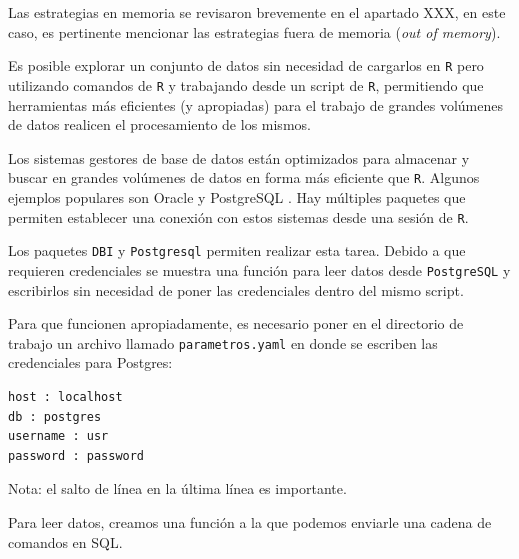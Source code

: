 \documentclass[]{article}
\begin{document}
Las estrategias en memoria se revisaron brevemente en el apartado XXX,
en este caso, es pertinente mencionar las estrategias fuera de memoria
(\emph{out of memory}).

Es posible explorar un conjunto de datos sin necesidad de cargarlos en
\texttt{R} pero utilizando comandos de \texttt{R} y trabajando desde un
script de \texttt{R}, permitiendo que herramientas más eficientes (y
apropiadas) para el trabajo de grandes volúmenes de datos realicen el
procesamiento de los mismos.

Los sistemas gestores de base de datos están optimizados para almacenar
y buscar en grandes volúmenes de datos en forma más eficiente que
\texttt{R}. Algunos ejemplos populares son Oracle y PostgreSQL
\parencite[][sección ``working with large datasets'']{peng2016m}. Hay
múltiples paquetes que permiten establecer una conexión con estos
sistemas desde una sesión de \texttt{R}.

Los paquetes \texttt{DBI} y \texttt{Postgresql} permiten realizar esta
tarea. Debido a que requieren credenciales se muestra una función para
leer datos desde \texttt{PostgreSQL} y escribirlos sin necesidad de
poner las credenciales dentro del mismo script.

Para que funcionen apropiadamente, es necesario poner en el directorio
de trabajo un archivo llamado \texttt{parametros.yaml} en donde se
escriben las credenciales para Postgres:

\begin{verbatim}
host : localhost
db : postgres
username : usr
password : password
\end{verbatim}

Nota: el salto de línea en la última línea es importante.

Para leer datos, creamos una función a la que podemos enviarle una
cadena de comandos en SQL.
\end{document}
